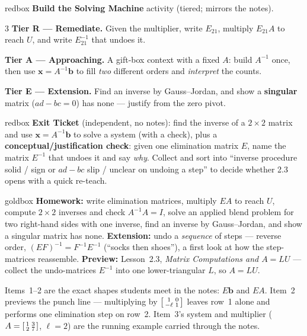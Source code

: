 \documentclass[10pt]{article}
\newcommand{\xx}{\mathbf{x}}
\newcommand{\bb}{\mathbf{b}}
\begin{document}
\begin{skillbox}{redbox}
\textbf{Build the Solving Machine} activity (tiered; mirrors the notes).
\begin{multicols}{3}
\textbf{Tier R --- Remediate.} Given the multiplier, write $E_{21}$, multiply $E_{21}A$ to reach $U$,
and write $E_{21}^{-1}$ that undoes it.

\columnbreak
\textbf{Tier A --- Approaching.} A gift-box context with a fixed $A$: build $A^{-1}$ once, then use
$\xx=A^{-1}\bb$ to fill \emph{two} different orders and \emph{interpret} the counts.

\columnbreak
\textbf{Tier E --- Extension.} Find an inverse by Gauss--Jordan, and show a \textbf{singular} matrix
($ad-bc=0$) has none --- justify from the zero pivot.
\end{multicols}
\end{skillbox}

\begin{skillbox}{redbox}
\textbf{Exit Ticket} (independent, no notes): find the inverse of a $2\times2$ matrix and use
$\xx=A^{-1}\bb$ to solve a system (with a check), plus a \textbf{conceptual/justification check}:
given one elimination matrix $E$, name the matrix $E^{-1}$ that undoes it and say \emph{why}. Collect
and sort into ``inverse procedure solid / sign or $ad-bc$ slip / unclear on undoing a step'' to
decide whether 2.3 opens with a quick re-teach.
\end{skillbox}

\begin{skillbox}{goldbox}
\textbf{Homework:} write elimination matrices, multiply $EA$ to reach $U$, compute $2\times2$
inverses and check $A^{-1}A=I$, solve an applied blend problem for two right-hand sides with one
inverse, find an inverse by Gauss--Jordan, and show a singular matrix has none. \textbf{Extension:}
undo a \emph{sequence} of steps --- reverse order, $(EF)^{-1}=F^{-1}E^{-1}$ (``socks then shoes''),
a first look at how the step-matrices reassemble. \textbf{Preview:} Lesson~2.3, \emph{Matrix
Computations and $A=LU$} --- collect the undo-matrices $E^{-1}$ into one lower-triangular $L$, so
$A=LU$.
\end{skillbox}

\begin{teachernote}[Warm-Up]
Items~1--2 are the exact shapes students meet in the notes: $E\bb$ and $EA$. Item~2 previews the
punch line --- multiplying by $\begin{bsmallmatrix} 1&0\\-\ell&1 \end{bsmallmatrix}$ leaves row~1
alone and performs one elimination step on row~2. Item~3's system and multiplier ($A=\begin{bsmallmatrix} 1&3\\2&7 \end{bsmallmatrix}$, $\ell=2$)
are the running example carried through the notes.
\end{teachernote}
\end{document}
